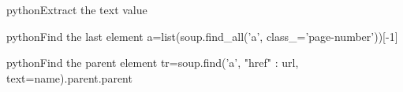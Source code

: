 \documentclass[10pt,a4paper]{article}
\begin{document}
\begin{multicols}{3}
\begin{codebox}{python}{Extract the text value}
\end{codebox}

\begin{codebox}{python}{Find the last element}
a=list(soup.find_all('a', class_='page-number'))[-1]

\end{codebox}

\begin{codebox}{python}{Find the parent element}
tr=soup.find('a', {"href" : url}, text=name).parent.parent

\end{codebox}


\AtNextBibliography{\footnotesize}
\printbibliography  
\end{multicols}
\end{document}

